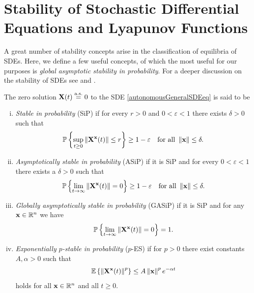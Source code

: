 \documentclass[a4paper,12pt,twoside,BCOR=10mm]{scrbook}
\begin{document}
\section{Stability of Stochastic Differential Equations and Lyapunov Functions}\label{SectionStabilitySDE}
A great number of stability concepts arise in the classification of equilibria of SDEs. Here, we define a few useful concepts, of which the most useful for our purposes is \textit{global asymptotic stability in probability}. For a deeper discussion on the stability of SDEs see \citep{mao2007stochastic} and \citep{sdestab2012khaminskii}.

\begin{definition}
The zero solution $\mathbf{X}(t) \stackrel{\text{a.s.}}{=} 0$ to the SDE \eqref{autonomousGeneralSDEeq} is said to be
\begin{enumerate}[i)]
    \item \textit{Stable in probability} (SiP) if for every $r > 0$ and $0 < \varepsilon < 1$ there exists $\delta > 0$ such that
    \begin{align*}
        \mathbb{P}\left\{\sup_{t\geq 0}\left\lVert\mathbf{X}^{\mathbf{x}}(t)\right\rVert\leq r\right\} \geq 1-\varepsilon \quad \text{for all } \left\lVert\mathbf{x}\right\rVert\leq \delta.
    \end{align*}
    \item \textit{Asymptotically stable in probability} (ASiP) if it is SiP and for every $0 < \varepsilon < 1$ there exists a $\delta > 0$ such that
    \begin{align*}
        \mathbb{P}\left\{\lim_{t\to \infty}\left\lVert\mathbf{X}^{\mathbf{x}}(t)\right\rVert = 0\right\} \geq 1 - \varepsilon \quad \text{for all } \left\lVert\mathbf{x}\right\rVert\leq \delta.
    \end{align*}
    \item \textit{Globally asymptotically stable in probability} (GASiP) if it is SiP and for any $\mathbf{x} \in \mathbb{R}^{n}$ we have
    \begin{align*}
        \mathbb{P}\left\{\lim_{t\to \infty} \left\lVert\mathbf{X}^{\mathbf{x}}(t)\right\rVert = 0\right\} = 1.
    \end{align*}
    \item \textit{Exponentially $p$-stable in probability} ($p$-ES) if for $p > 0$ there exist constants $A, \alpha > 0$ such that
    \begin{align*}
        \mathbb{E}\left\{\left\lVert\mathbf{X}^{\mathbf{x}}(t)\right\rVert^p \right\} \leq A\left\lVert\mathbf{x}\right\rVert^p e^{-\alpha t}
    \end{align*}
    holds for all $\mathbf{x} \in \mathbb{R}^{n}$ and all $t \geq 0$.
\end{enumerate}
\end{definition}
\end{document}
